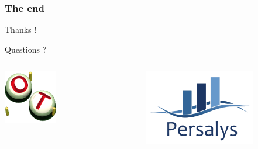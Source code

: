 \documentclass[aspectratio=169]{beamer}
\begin{document}

\begin{frame}
\frametitle{The end}

\begin{center}
Thanks !
\end{center}

\begin{center}
Questions ?
\end{center}

\begin{columns}
\centering
\includegraphics[width=0.4\textwidth]{figures/logo-openturns.png}

\includegraphics[width=0.7\textwidth]{figures/PERSALYS-LOGO.png}

\end{columns}

\end{frame}
  
\end{document}
